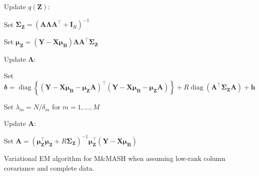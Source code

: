 \documentclass[11pt,authoryear]{article}
\DeclareMathOperator*{\diag}{diag}
\newcommand{\bs}[1]{\boldsymbol{#1}}
\begin{document}
\begin{algorithm}
\begin{algorithmic}
\begin{description}
  \end{description}
  \STATE Update $q(\bs{Z})$:
  \begin{description}
  \item Set $\bs{\Sigma}_{\bs{Z}} = \left(\bs{A}\bs{\Lambda}\bs{A}^{\intercal} + \bs{I}_R\right)^{-1}$
  \item Set $\bs{\mu}_{\bs{Z}} = (\bs{Y}-\bs{X}\bs{\mu}_{\bs{B}})\bs{\Lambda} \bs{A}^{\intercal}\bs{\Sigma}_{\bs{Z}}$
  \end{description}
  \STATE Update $\bs{\Lambda}$:
  \begin{description}
  \item Set $\bs{\delta} = \diag\left\{(\bs{Y}-\bs{X}\bs{\mu}_{\bs{B}} - \bs{\mu}_{\bs{Z}}\bs{A})^{\intercal}(\bs{Y}-\bs{X}\bs{\mu}_{\bs{B}} - \bs{\mu}_{\bs{Z}}\bs{A})\right\} + R\diag(\bs{A}^{\intercal}\bs{\Sigma}_{\bs{Z}}\bs{A}) + \bs{h}$
  \item Set $\lambda_m = N / \delta_m$ for $m = 1,\ldots,M$
  \end{description}
  \STATE Update $\bs{A}$:
  \begin{description}
  \item Set $\bs{A} = \left(\bs{\mu}_{\bs{Z}}^{\intercal}\bs{\mu}_{\bs{Z}} + R\bs{\Sigma}_{\bs{Z}}\right)^{-1} \bs{\mu}_{\bs{Z}}^{\intercal}(\bs{Y} - \bs{X}\bs{\mu}_{\bs{B}})$
  \end{description}
\end{algorithmic}
\caption{Variational EM algorithm for M\&MASH when assuming low-rank column covariance and complete data.}
\label{algorithm:vem}
\end{algorithm}
\end{document}
